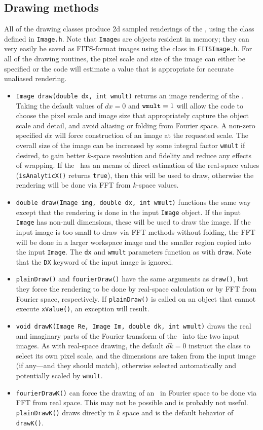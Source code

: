 \documentclass[11pt,preprint,flushrt]{aastex}
\begin{document}
\subsection{Drawing methods}
All of the drawing classes produce 2d sampled renderings of the \sbp, using the class defined in {\tt Image.h}.  Note that {\tt Image}s are objects resident in memory; they can very easily be saved as FITS-format images using the class in {\tt FITSImage.h}.  For all of the drawing routines, the pixel scale and size of the image can either be specified or the code will estimate a value that is appropriate for accurate unaliased rendering.  
\begin{itemize}
\item {\tt Image draw(double dx, int wmult)} returns an image rendering of the \sbp.  Taking the default values of $dx=0$ and ${\tt wmult}=1$ will allow the code to choose the pixel scale and image size that appropriately capture the object scale and detail, and avoid aliasing or folding from Fourier space.  A non-zero specified $dx$ will force construction of an image at the requested scale.  The overall size of the image can be increased by some integral factor {\tt wmult} if desired, to gain better $k$-space resolution and fidelity and reduce any effects of wrapping.  If the \sbp\ has an means of direct estimation of the real-space values ({\tt isAnalyticX()} returns {\tt true}), then this will be used to draw, otherwise the rendering will be done via FFT from $k$-space values.
\item {\tt double draw(Image img, double dx, int wmult)} functions the same way except that the rendering is done in the input {\tt Image} object.  If the input {\tt Image} has non-null dimensions, these will be used to draw the image.  If the input image is too small to draw via FFT methods without folding, the FFT will be done in a larger workspace image and the smaller region copied into the input {\tt Image}.  The {\tt dx} and {\tt wmult} parameters function as with {\tt draw}.  Note that the {\tt DX} keyword of the input image is ignored.
\item {\tt plainDraw()} and {\tt fourierDraw()} have the same arguments as {\tt draw()}, but they force the rendering to be done by real-space calculation or by FFT from Fourier space, respectively.  If {\tt plainDraw()} is called on an object that cannot execute {\tt xValue()}, an exception will result.
\item {\tt void drawK(Image Re, Image Im, double dk, int wmult)} draws the real and imaginary parts of the Fourier transform of the \sbp\ into the two input images.  As with real-space drawing, the default $dk=0$ instruct the class to select its own pixel scale, and the dimensions are taken from the input image (if any---and they should match), otherwise selected automatically and potentially scaled by {\tt wmult}.
\item {\tt fourierDrawK()} can force the drawing of an \sbp\ in Fourier space to be done via FFT from real space.  This may not be possible and is probably not useful.  {\tt plainDrawK()} draws directly in $k$ space and is the default behavior of {\tt drawK()}.
\end{itemize}
\end{document}
